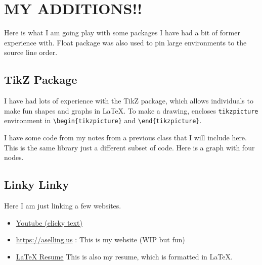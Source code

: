 \documentclass{article} %
\begin{document}
\section{MY ADDITIONS!!}
Here is what I am going play with some packages I have had a bit of former experience with. Float package was also used to pin large environments to the source line order.
\subsection{TikZ Package}
I have had lots of experience with the TikZ package, which allows individuals to make fun shapes and graphs in \LaTeX. To make a drawing, encloses \texttt{tikzpicture} environment in \texttt{\textbackslash begin\{tikzpicture\}} and \texttt{\textbackslash end\{tikzpicture\}}.

I have some code from my notes from a previous class that I will include here.\\
This is the same library just a different subset of code. Here is a graph with four nodes.\\


\subsection{Linky Linky}
Here I am just linking a few websites.
\begin{itemize}
	\item \href{https://www.youtube.com/}{Youtube (clicky text)}
	\item \url{https://aselling.us} : This is my website (WIP but fun)
	\item \href{https://aselling-us.github.io/resume/ArjanEllingsonResume.pdf}{LaTeX Resume} This is also my resume, which is formatted in \LaTeX.
\end{itemize}
\end{document}
